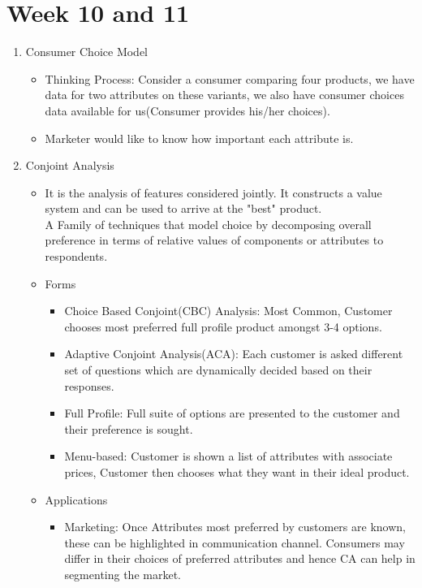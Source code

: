 \documentclass[a4paper]{article}
\begin{document}
 \section{Week 10 and 11}
 \begin{enumerate}
     \item Consumer Choice Model
     \begin{itemize}
         \item Thinking Process: Consider a consumer comparing four products, we have data for two attributes on these variants, we also have consumer choices data available for us(Consumer provides his/her choices).
         \item Marketer would like to know how important each attribute is.
     \end{itemize}
     \item Conjoint Analysis
     \begin{itemize}
         \item It is the analysis of features considered jointly. It constructs a value system and can be used to arrive at the "best" product.\\
         A Family of techniques that model choice by decomposing overall preference in terms of relative values of components or attributes to respondents.
         \item Forms
         \begin{itemize}
             \item Choice Based Conjoint(CBC) Analysis: Most Common, Customer chooses most preferred full profile product amongst 3-4 options.
             \item Adaptive Conjoint Analysis(ACA): Each customer is asked different set of questions which are dynamically decided based on their responses.
             \item Full Profile: Full suite of options are presented to the customer and their preference is sought.
             \item Menu-based: Customer is shown a list of attributes with associate prices, Customer then chooses what they want in their ideal product.
         \end{itemize}
         \item Applications
         \begin{itemize}
             \item Marketing: Once Attributes most preferred by customers are known, these can be highlighted in communication channel. Consumers may differ in their choices of preferred attributes and hence CA can help in segmenting the market.

\end{itemize}
\end{itemize}
\end{enumerate}
\end{document}
